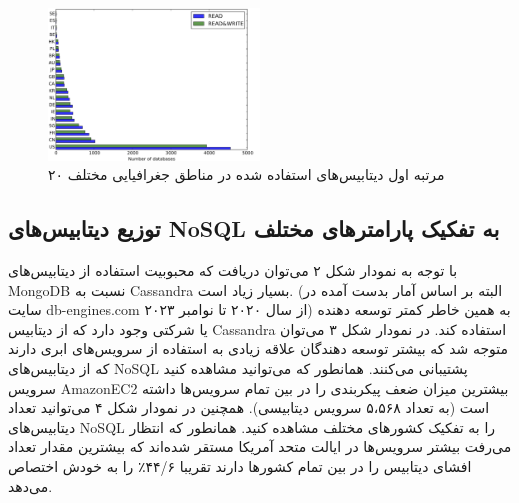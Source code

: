 \documentclass[10pt, a4paper]{article}
\begin{document}
\begin{figure}
    \centering
    \includegraphics[width=0.5\textwidth]{res/fig3.png}
    \caption{۲۰ مرتبه اول دیتابیس‌‌های استفاده شده در مناطق جغرافیایی مختلف}
    \label{fig: diagram}
\end{figure}

\subsection{توزیع دیتابیس‌های NoSQL به تفکیک پارامتر‌های مختلف}

\begin{LTR}
    \begin{table}[h]
        \centering
        \begin{RTL}
            \caption{تعداد سرویس‌های افشا شده NoSQL}
        \end{RTL}
    \end{table}
\end{LTR}

با توجه به نمودار شکل ۲ می‌توان دریافت که محبوبیت استفاده از دیتابیس‌های MongoDB
نسبت به Cassandra بسیار زیاد است. (البته بر اساس آمار بدست آمده در سایت
db-engines.com از سال ۲۰۲۰ تا نوامبر ۲۰۲۳) به همین خاطر کمتر توسعه دهنده یا
شرکتی وجود دارد که از دیتابیس Cassandra استفاده کند. در نمودار شکل ۳ می‌توان
متوجه شد که بیشتر توسعه دهندگان علاقه زیادی به استفاده از سرویس‌های ابری دارند
که از دیتابیس‌های NoSQL پشتیبانی می‌کنند. همانطور که می‌توانید مشاهده کنید سرویس
AmazonEC2 بیشترین میزان ضعف پیکربندی را در بین تمام سرویس‌ها داشته است (به تعداد
۵،۵۶۸ سرویس دیتابیسی). همچنین در نمودار شکل ۴ می‌توانید تعداد دیتابیس‌های NoSQL
را به تفکیک کشور‌های مختلف مشاهده کنید. همانطور که انتظار می‌رفت بیشتر سرویس‌ها
در ایالت متحد آمریکا مستقر شده‌اند  که بیشترین مقدار تعداد افشای دیتابیس را در
بین تمام کشور‌ها دارند تقریبا ۴۴/۶٪ را به خودش اختصاص می‌دهد.
\end{document}
